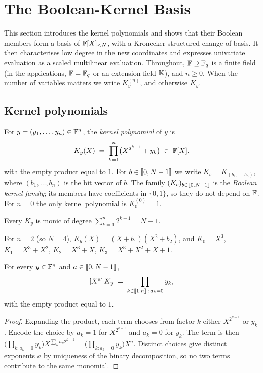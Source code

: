 \section{The Boolean-Kernel Basis}\label{sec:kernel}

This section introduces the kernel polynomials and shows that their Boolean members form a basis of $\mathbb{F}[X]_{<N}$, with a Kronecker-structured change of basis.
It then characterises low degree in the new coordinates and expresses univariate evaluation as a scaled multilinear evaluation.
Throughout, $\mathbb{F} \supseteq \mathbb{F}_q$ is a finite field (in the applications, $\mathbb{F} = \mathbb{F}_q$ or an extension field $\mathbb{K}$), and $n \ge 0$.
When the number of variables matters we write $K^{(n)}_y$, and otherwise $K_y$.

\subsection{Kernel polynomials}\label{sec:kernel:def}

\begin{definition}\label{def:kernel}
For $y = (y_1,\dots,y_n) \in \mathbb{F}^n$, the \emph{kernel polynomial} of $y$ is
\[
  K_y(X) \;=\; \prod_{k=1}^{n} \bigl( X^{2^{k-1}} + y_k \bigr) \;\in\; \mathbb{F}[X],
\]
with the empty product equal to $1$.
For $b \in \llbracket 0, N-1 \rrbracket$ we write $K_b = K_{(b_1,\dots,b_n)}$, where $(b_1,\dots,b_n)$ is the bit vector of $b$.
The family $(K_b)_{b \in \llbracket 0, N-1 \rrbracket}$ is the \emph{Boolean kernel family}; its members have coefficients in $\{0,1\}$, so they do not depend on $\mathbb{F}$.
For $n = 0$ the only kernel polynomial is $K^{(0)}_0 = 1$.
\end{definition}

Every $K_y$ is monic of degree $\sum_{k=1}^{n} 2^{k-1} = N-1$.

\begin{example}\label{ex:n2}
For $n = 2$ (so $N = 4$), $K_b(X) = (X + b_1)(X^2 + b_2)$, and
$K_0 = X^3$, \;
$K_1 = X^3 + X^2$, \;
$K_2 = X^3 + X$, \;
$K_3 = X^3 + X^2 + X + 1$.
\end{example}

\begin{lemma}\label{lem:coeff-rule}
For every $y \in \mathbb{F}^n$ and $a \in \llbracket 0, N-1 \rrbracket$,
\[
  [X^{a}]\,K_y \;=\; \prod_{k \in \llbracket 1, n \rrbracket \,:\, a_k = 0} y_k ,
\]
with the empty product equal to $1$.
\end{lemma}

\begin{proof}
Expanding the product, each term chooses from factor $k$ either $X^{2^{k-1}}$ or $y_k$.
Encode the choice by $a_k = 1$ for $X^{2^{k-1}}$ and $a_k = 0$ for $y_k$.
The term is then $\bigl(\prod_{k : a_k = 0} y_k\bigr) X^{\sum_k a_k 2^{k-1}} = \bigl(\prod_{k : a_k = 0} y_k\bigr) X^{a}$.
Distinct choices give distinct exponents $a$ by uniqueness of the binary decomposition, so no two terms contribute to the same monomial.
\end{proof}

